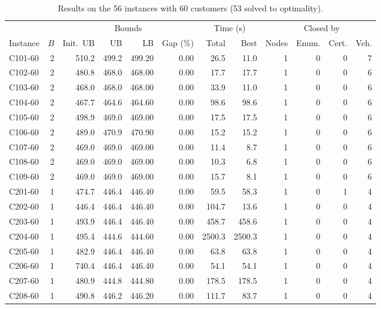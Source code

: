 \documentclass[10pt]{article}
\begin{document}
\begin{table}[p]
\centering
\caption{Results on the 56 instances with 60 customers (53 solved to optimality).}
\label{tab:n60}
\footnotesize
\setlength{\tabcolsep}{5pt}
\begin{tabular}{lrrrrrrrrrrr}
\toprule
 & & \multicolumn{4}{c}{Bounds} & \multicolumn{2}{c}{Time (s)} & & \multicolumn{2}{c}{Closed by} & \\
\cmidrule(lr){3-6}\cmidrule(lr){7-8}\cmidrule(lr){10-11}
Instance & $B$ & Init.\ UB & UB & LB & Gap (\%) & Total & Best & Nodes & Enum. & Cert. & Veh. \\
\midrule
C101-60 & 2 & 510.2 & 499.2 & 499.20 & 0.00 & 26.5 & 11.0 & 1 & 0 & 0 & 7 \\
C102-60 & 2 & 480.8 & 468.0 & 468.00 & 0.00 & 17.7 & 17.7 & 1 & 0 & 0 & 6 \\
C103-60 & 2 & 468.0 & 468.0 & 468.00 & 0.00 & 33.9 & 11.0 & 1 & 0 & 0 & 6 \\
C104-60 & 2 & 467.7 & 464.6 & 464.60 & 0.00 & 98.6 & 98.6 & 1 & 0 & 0 & 6 \\
C105-60 & 2 & 498.9 & 469.0 & 469.00 & 0.00 & 17.5 & 17.5 & 1 & 0 & 0 & 6 \\
C106-60 & 2 & 489.0 & 470.9 & 470.90 & 0.00 & 15.2 & 15.2 & 1 & 0 & 0 & 6 \\
C107-60 & 2 & 469.0 & 469.0 & 469.00 & 0.00 & 11.4 & 8.7 & 1 & 0 & 0 & 6 \\
C108-60 & 2 & 469.0 & 469.0 & 469.00 & 0.00 & 10.3 & 6.8 & 1 & 0 & 0 & 6 \\
C109-60 & 2 & 469.0 & 469.0 & 469.00 & 0.00 & 15.7 & 8.1 & 1 & 0 & 0 & 6 \\
\midrule
C201-60 & 1 & 474.7 & 446.4 & 446.40 & 0.00 & 59.5 & 58.3 & 1 & 0 & 1 & 4 \\
C202-60 & 1 & 446.4 & 446.4 & 446.40 & 0.00 & 104.7 & 13.6 & 1 & 0 & 0 & 4 \\
C203-60 & 1 & 493.9 & 446.4 & 446.40 & 0.00 & 458.7 & 458.6 & 1 & 0 & 0 & 4 \\
C204-60 & 1 & 495.4 & 444.6 & 444.60 & 0.00 & 2500.3 & 2500.3 & 1 & 0 & 0 & 4 \\
C205-60 & 1 & 482.9 & 446.4 & 446.40 & 0.00 & 63.8 & 63.8 & 1 & 0 & 0 & 4 \\
C206-60 & 1 & 740.4 & 446.4 & 446.40 & 0.00 & 54.1 & 54.1 & 1 & 0 & 0 & 4 \\
C207-60 & 1 & 480.9 & 444.8 & 444.80 & 0.00 & 178.5 & 178.5 & 1 & 0 & 0 & 4 \\
C208-60 & 1 & 490.8 & 446.2 & 446.20 & 0.00 & 111.7 & 83.7 & 1 & 0 & 0 & 4 \\

\end{tabular}
\end{table}
\end{document}
